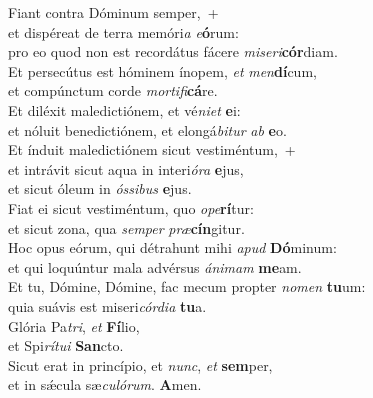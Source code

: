 \evenverse Fiant contra Dóminum semper,~+\\\evenverse  et dispéreat de terra memóri\textit{a} \textit{e}\textbf{ó}rum:~\*\\
\evenverse pro eo quod non est recordátus fácere \textit{mi}\textit{se}\textit{ri}\textbf{cór}diam.\\
\oddverse Et persecútus est hóminem ínopem, \textit{et} \textit{men}\textbf{dí}cum,~\*\\
\oddverse et compúnctum corde \textit{mor}\textit{ti}\textit{fi}\textbf{cá}re.\\
\evenverse Et diléxit maledictiónem, et vé\textit{ni}\textit{et} \textbf{e}i:~\*\\
\evenverse et nóluit benedictiónem, et elongá\textit{bi}\textit{tur} \textit{ab} \textbf{e}o.\\
\oddverse Et índuit maledictiónem sicut vestiméntum,~+\\
\oddverse  et intrávit sicut aqua in interi\textit{ó}\textit{ra} \textbf{e}jus,~\*\\
\oddverse et sicut óleum in \textit{ós}\textit{si}\textit{bus} \textbf{e}jus.\\
\evenverse Fiat ei sicut vestiméntum, quo \textit{o}\textit{pe}\textbf{rí}tur:~\*\\
\evenverse et sicut zona, qua \textit{sem}\textit{per} \textit{præ}\textbf{cín}gitur.\\
\oddverse Hoc opus eórum, qui détrahunt mihi \textit{a}\textit{pud} \textbf{Dó}minum:~\*\\
\oddverse et qui loquúntur mala advérsus \textit{á}\textit{ni}\textit{mam} \textbf{me}am.\\
\evenverse Et tu, Dómine, Dómine, fac mecum propter \textit{no}\textit{men} \textbf{tu}um:~\*\\
\evenverse quia suávis est miseri\textit{cór}\textit{di}\textit{a} \textbf{tu}a.\\
\oddverse Glória Pa\textit{tri}, \textit{et} \textbf{Fí}lio,~\*\\
\oddverse et Spi\textit{rí}\textit{tu}\textit{i} \textbf{San}cto.\\
\evenverse Sicut erat in princípio, et \textit{nunc}, \textit{et} \textbf{sem}per,~\*\\
\evenverse et in sǽcula sæ\textit{cu}\textit{ló}\textit{rum}. \textbf{A}men.\\
